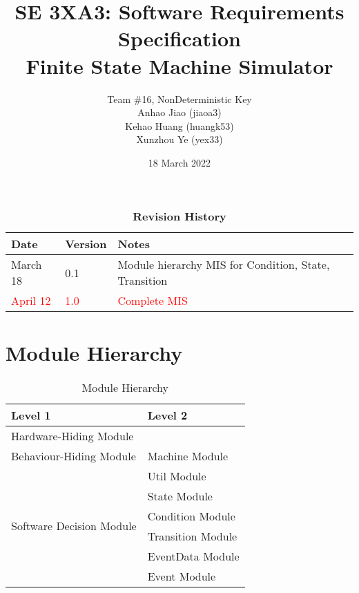 \documentclass[12pt,titlepage]{article}
\title{SE 3XA3: Software Requirements Specification\\
  Finite State Machine Simulator}
\author{Team \#16, NonDeterministic Key
  \\ Anhao Jiao (jiaoa3)
  \\ Kehao Huang (huangk53)
  \\ Xunzhou Ye (yex33)
}
\date{18 March 2022}
\begin{document}
\maketitle

\tableofcontents
\listoftables

\begin{table}[bp]
  \caption{\bf Revision History}
  \begin{tabularx}{\textwidth}{p{3cm}p{2cm}X}
    \toprule {\bf Date} & {\bf Version} & {\bf Notes}\\
    \midrule
    March 18 & 0.1 & Module hierarchy MIS for Condition, State, Transition \\
    \textcolor{red}{April 12} & \textcolor{red}{1.0} & \textcolor{red}{Complete MIS} \\
    \bottomrule
  \end{tabularx}
\end{table}


\newpage
\section{Module Hierarchy}

\begin{table}[H]
  \centering
  \begin{tabular}{p{} p{}}
    \toprule
    \textbf{Level 1} & \textbf{Level 2}\\
    \midrule

    {Hardware-Hiding Module} & ~ \\
    \midrule

    \multirow{1}{0.3\textwidth}{Behaviour-Hiding Module} & Machine Module\\
    \midrule

    \multirow{6}{0.3\textwidth}{Software Decision Module} & {Util Module}\\
                     & State Module\\
                     & Condition Module\\
                     & Transition Module\\
                     & EventData Module\\
                     & Event Module\\

    \bottomrule

  \end{tabular}
  \caption{Module Hierarchy}
  \label{TblMH}
\end{table}
\end{document}
